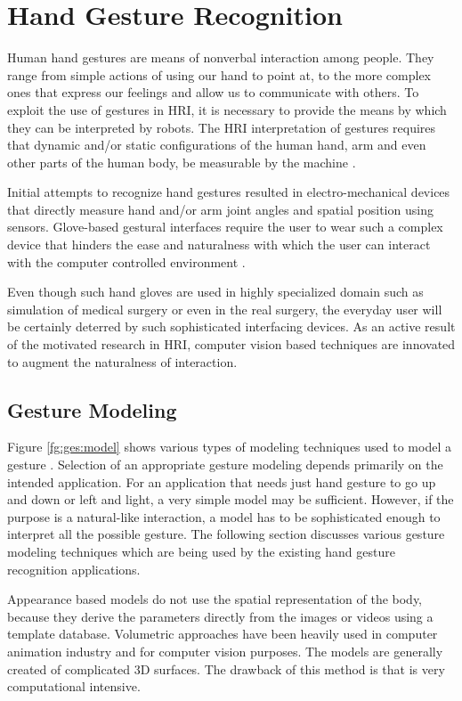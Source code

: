 \section{Hand Gesture Recognition} Human hand gestures are means of nonverbal interaction among people. They range from simple actions of using our hand to point at, to the more complex ones that express our feelings and allow us to communicate with others. To exploit the use of gestures in HRI, it is necessary to provide the means by which they can be interpreted by robots. The HRI interpretation of gestures requires that dynamic and/or static configurations of the human hand, arm and even other parts of the human body, be measurable by the machine \cite{2}. 

Initial attempts to recognize hand gestures resulted in electro-mechanical devices that directly measure hand and/or arm joint angles and spatial position using sensors. Glove-based gestural interfaces require the user to wear such a complex device that hinders the ease and naturalness with which the user can interact with the computer controlled environment \cite{10}. 

Even though such hand gloves are used in highly specialized domain such as simulation of medical surgery or even in the real surgery, the everyday user will be certainly deterred by such sophisticated interfacing devices. As an active result of the motivated research in HRI, computer vision based techniques are innovated to augment the naturalness of interaction.

\subsection{Gesture Modeling} Figure \ref{fg:ges:model} shows various types of modeling techniques used to model a gesture \cite{2}. Selection of an appropriate gesture modeling depends primarily on the intended application. For an application that needs just hand gesture to go up and down or left and light, a very simple model may be sufficient. However, if the purpose is a natural-like interaction, a model has to be sophisticated enough to interpret all the possible gesture. The following section discusses various gesture modeling techniques which are being used by the existing hand gesture recognition applications. 



Appearance based models do not use the spatial representation of the body, because they derive the parameters directly from the images or videos using a template database. Volumetric approaches have been heavily used in computer animation industry and for computer vision purposes. The models are generally created of complicated 3D surfaces. The drawback of this method is that is very computational intensive. 

